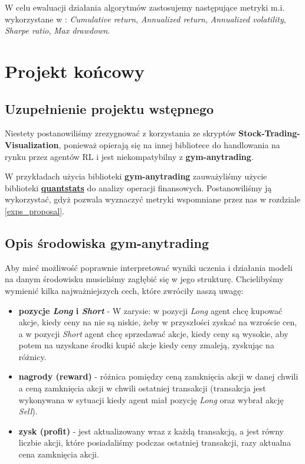 \documentclass[12pt,a4paper]{article}
\begin{document}
W celu ewaluacji działania algorytmów zastosujemy następujące metryki
m.i. wykorzystane w \cite{ensemble_strat}: \emph{Cumulative return},
\emph{Annualized return}, \emph{Annualized volatility}, \emph{Sharpe ratio},
\emph{Max drawdown}.

\pagebreak
\section{Projekt końcowy}

\subsection{Uzupełnienie projektu wstępnego}

Niestety postanowiliśmy zrezygnować z korzystania ze skryptów \textbf{Stock-Trading-Visualization},
ponieważ opierają się na innej bibliotece do handlowania na rynku przez
agentów RL i jest niekompatybilny z \textbf{gym-anytrading}.

W przykładach użycia biblioteki \textbf{gym-anytrading} zauważyliśmy
użycie biblioteki
\textbf{\href{https://github.com/ranaroussi/quantstats}{quantstats}}
do analizy operacji finansowych. Postanowiliśmy ją wykorzystać, gdyż
pozwala wyznaczyć metryki wspomniane przez nas w rozdziale
\ref{exps_proposal}.

\subsection{Opis środowiska gym-anytrading}

Aby mieć możliwość poprawnie interpretować wyniki uczenia i działania
modeli na danym środowisku musieliśmy zagłębić się w jego strukturę.
Chcielibyśmy wymienić kilka najważniejszych cech, które zwróciły naszą
uwagę:

\begin{itemize}
  \item \textbf{pozycje \emph{Long} i \emph{Short}} -
        W zarysie: w pozycji \emph{Long} agent chcę kupować akcje, kiedy
        ceny na nie są niskie, żeby w przyszłości zyskać na wzroście cen,
        a w pozycji \emph{Short} agent chcę sprzedawać akcje, kiedy ceny
        są wysokie, aby potem na uzyskane środki kupić akcje kiedy ceny
        zmaleją, zyskując na różnicy.
  \item \textbf{nagrody (reward)} - różnica pomiędzy ceną zamknięcia akcji w danej
        chwili a ceną zamknięcia akcji w chwili ostatniej transakcji
        (transakcja jest wykonywana w sytuacji kiedy agent miał pozycję
        \emph{Long} oraz wybrał akcję \emph{Sell}).
  \item \textbf{zysk (profit)} - jest aktualizowany wraz z każdą
        transakcją, a jest równy liczbie akcji, które posiadaliśmy podczas
        ostatniej transakcji, razy aktualna cena zamknięcia akcji.

\end{itemize}
\end{document}
